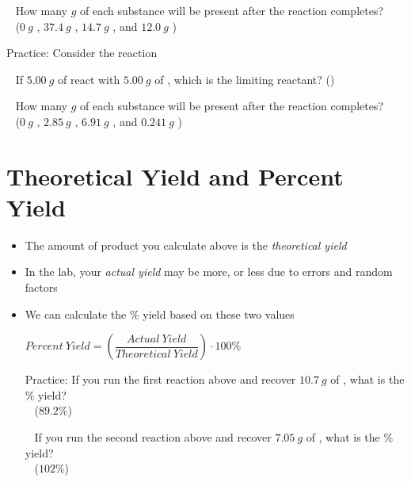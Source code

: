 \documentclass[12pt, openany, letterpaper]{memoir}
\begin{document}
\begin{itemize}
	      ~\hphantom{Practice:} How many $g$ of each substance will be present after the reaction completes?\\
	      ~\hphantom{Practice: } ($0~g$ , $37.4~g$ , $14.7~g$ , and $12.0~g$ )

	      Practice: Consider the reaction 

	      ~\hphantom{Practice:} If $5.00~g$ of  react with $5.00~g$ of , which is the limiting reactant? \hspace{1em} ()

	      ~\hphantom{Practice:} How many $g$ of each substance will be present after the reaction completes?\\
	      ~\hphantom{Practice: } ($0~g$ , $2.85~g$ , $6.91~g$ , and $0.241~g$ )
\end{itemize}
\section{Theoretical Yield and Percent Yield}
\begin{itemize}
	\item The amount of product you calculate above is the \emph{theoretical yield}
	\item In the lab, your \emph{actual yield} may be more, or less due to errors and random factors
	\item We can calculate the \% yield based on these two values

	      $Percent~Yield = \left(\dfrac{Actual~Yield}{Theoretical~Yield}\right)\cdot 100\%$

	      Practice: If you run the first reaction above and recover $10.7~g$ of , what is the \% yield?\\
	      ~\hphantom{Practice: } ($89.2\%$)

	      ~\hphantom{Practice:} If you run the second reaction above and recover $7.05~g$ of , what is the \% yield?\\
	      ~\hphantom{Practice: } ($102\%$)
\end{itemize}
\end{document}
